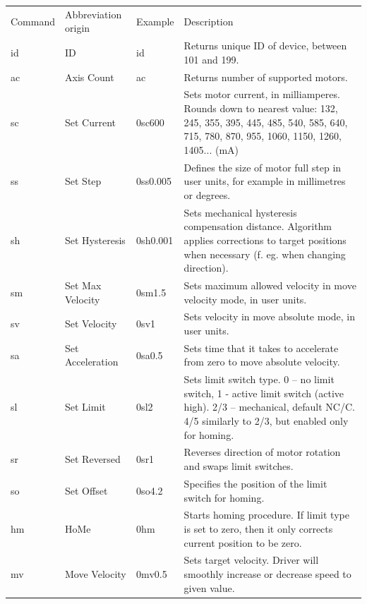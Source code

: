 \documentclass[10pt,article]{article}
\begin{document}
\begin{table}[ht] \centering
\begin{tabularx}{\textwidth}{lllX}
\rowcolor[gray]{0.80} Command & Abbreviation origin & Example & Description\\
\rowcolor[gray]{0.90} id & ID & id & Returns unique ID of device, between 101 and 199.\\
\rowcolor[gray]{0.95} ac & Axis Count & ac & Returns number of supported motors.\\
\rowcolor[gray]{0.90} sc & Set Current & 0sc600 &Sets motor current, in milliamperes. Rounds down to nearest value: 132, 245, 355, 395, 445, 485, 540, 585, 640, 715, 780, 870, 955, 1060, 1150, 1260, 1405... (mA) \\
\rowcolor[gray]{0.95} ss & Set Step & 0ss0.005 & Defines the size of motor full step in user units, for example in millimetres or degrees. \\
\rowcolor[gray]{0.90} sh & Set Hysteresis & 0sh0.001 & Sets mechanical hysteresis compensation distance. Algorithm applies corrections to target positions when necessary (f. eg. when changing direction). \\
\rowcolor[gray]{0.95} sm & Set Max Velocity & 0sm1.5 & Sets maximum allowed velocity in move velocity mode, in user units. \\
\rowcolor[gray]{0.90} sv & Set Velocity & 0sv1 & Sets velocity in move absolute mode, in user units. \\
\rowcolor[gray]{0.95} sa & Set Acceleration & 0sa0.5 & Sets time that it takes to accelerate from zero to move absolute velocity. \\
\rowcolor[gray]{0.90} sl & Set Limit & 0sl2 & Sets limit switch type. 0 – no limit switch, 1 - active limit switch (active high). 2/3 – mechanical, default NC/C. 4/5 similarly to 2/3, but enabled only for homing. \\
\rowcolor[gray]{0.95} sr & Set Reversed & 0sr1 & Reverses direction of motor rotation and swaps limit switches. \\
\rowcolor[gray]{0.90} so & Set Offset & 0so4.2 & Specifies the position of the limit switch for homing. \\
\rowcolor[gray]{0.95} hm & HoMe & 0hm & Starts homing procedure. If limit type is set to zero, then it only corrects current position to be zero. \\
\rowcolor[gray]{0.90} mv & Move Velocity & 0mv0.5 & Sets target velocity. Driver will smoothly increase or decrease speed to given value. \\

\end{tabularx}
\end{table}
\end{document}
